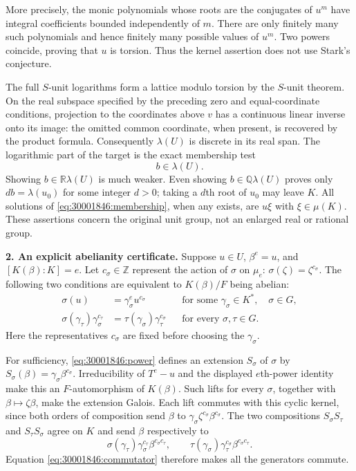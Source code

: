 \documentclass[11pt,a4paper]{article}
\newcommand{\Z}{\mathbb{Z}}
\newcommand{\Q}{\mathbb{Q}}
\newcommand{\R}{\mathbb{R}}
\numberwithin{equation}{section}
\begin{document}
More precisely, the monic polynomials whose roots are the conjugates of
$u^m$ have integral coefficients bounded independently of $m$. There are
only finitely many such polynomials and hence finitely many possible
values of $u^m$. Two powers coincide, proving that $u$ is torsion.
Thus the kernel assertion does not use Stark's conjecture.

The full $S$-unit logarithms form a lattice modulo torsion by the
$S$-unit theorem. On the real subspace specified by the preceding zero
and equal-coordinate conditions, projection to the coordinates above
$v$ has a continuous linear inverse onto its image: the omitted common
coordinate, when present, is recovered by the product formula.
Consequently $\lambda(U)$ is discrete in its real span. The logarithmic
part of the target is the exact membership test
\begin{equation}\label{eq:30001846:membership}
                         b\in\lambda(U).
\end{equation}
Showing $b\in\R\lambda(U)$ is much weaker. Even showing
$b\in\Q\lambda(U)$ proves only $db=\lambda(u_0)$ for some integer
$d>0$; taking a $d$th root of $u_0$ may leave $K$. All solutions of
\eqref{eq:30001846:membership}, when any exists, are $u\xi$ with
$\xi\in\mu(K)$. These assertions concern the original unit group, not
an enlarged real or rational group.

\textbf{2. An explicit abelianity certificate.}
Suppose $u\in U$, $\beta^e=u$, and $[K(\beta):K]=e$. Let
$c_\sigma\in\Z$ represent the action of $\sigma$ on $\mu_e$:
$\sigma(\zeta)=\zeta^{c_\sigma}$. The following two conditions are
equivalent to $K(\beta)/F$ being abelian:
\begin{align}
 \sigma(u)&=\gamma_\sigma^e u^{c_\sigma}
       &&\text{for some }\gamma_\sigma\in K^*,\quad\sigma\in G,
       \label{eq:30001846:power}\\
 \sigma(\gamma_\tau)\gamma_\sigma^{c_\tau}
       &=\tau(\gamma_\sigma)\gamma_\tau^{c_\sigma}
       &&\text{for every }\sigma,\tau\in G.
       \label{eq:30001846:commutator}
\end{align}
Here the representatives $c_\sigma$ are fixed before choosing the
$\gamma_\sigma$.

For sufficiency, \eqref{eq:30001846:power} defines an extension
$S_\sigma$ of $\sigma$ by
$S_\sigma(\beta)=\gamma_\sigma\beta^{c_\sigma}$.
Irreducibility of $T^e-u$ and the displayed $e$th-power identity make
this an $F$-automorphism of $K(\beta)$. Such lifts for every $\sigma$,
together with $\beta\mapsto\zeta\beta$, make the extension Galois.
Each lift commutes with this cyclic kernel, since both orders of
composition send $\beta$ to
$\gamma_\sigma\zeta^{c_\sigma}\beta^{c_\sigma}$.
The two compositions $S_\sigma S_\tau$ and $S_\tau S_\sigma$ agree
on $K$ and send $\beta$ respectively to
\[
 \sigma(\gamma_\tau)\gamma_\sigma^{c_\tau}
       \beta^{c_\sigma c_\tau},\qquad
 \tau(\gamma_\sigma)\gamma_\tau^{c_\sigma}
       \beta^{c_\sigma c_\tau}.
\]
Equation \eqref{eq:30001846:commutator} therefore makes all the generators
commute.
\end{document}
